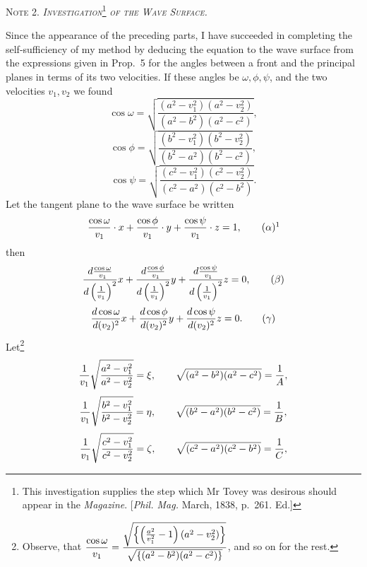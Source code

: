 \documentclass[11pt]{article}
\begin{document}
\begin{center}{\scshape Note 2. \quad \emph{Investigation}\footnote{This investigation supplies the step which Mr Tovey was desirous should appear in the \emph{Magazine}. [\emph{Phil. Mag.} March, 1838, p.~261. Ed.]} \emph{of the Wave Surface.}}\end{center}

Since the appearance of the preceding parts, I have succeeded in completing the self-sufficiency of my method by deducing the equation to the wave surface from the expressions given in Prop.~5 for the angles between a front and the principal planes in terms of its two velocities. If these angles be $\omega,\phi,\psi$, and the two velocities $v_1,v_2$ we found
\[
 \cos\omega=\sqrt{\frac{(a^2-v_1^2)(a^2-v_2^2)}{(a^2-b^2)(a^2-c^2)}},
\]
\[
 \cos\phi=\sqrt{\frac{(b^2-v_1^2)(b^2-v_2^2)}{(b^2-a^2)(b^2-c^2)}},
\]
\[
 \cos\psi=\sqrt{\frac{(c^2-v_1^2)(c^2-v_2^2)}{(c^2-a^2)(c^2-b^2)}}.
\]
Let the tangent plane to the wave surface be written
\[
 {\cos\omega\over v_1}\cdot x+{\cos\phi\over v_1}\cdot y+{\cos\psi\over v_1}\cdot z=1,\tag{$\alpha$}\footnotemark
\]
then
\[
 \frac{d{\cos\omega\over v_1}}{d\left({1\over v_1}\right)^2}x
 +\frac{d{\cos\phi\over v_1}}{d\left({1\over v_1}\right)^2}y
 +\frac{d{\cos\psi\over v_1}}{d\left({1\over v_1}\right)^2}z=0,\tag{$\beta$}
\]
\[
 {d\cos\omega\over d(v_2)^2}x+{d\cos\phi\over d(v_2)^2}y+{d\cos\psi\over d(v_2)^2}z=0.\tag{$\gamma$}
\]
Let\footnote{Observe, that $\dfrac{\cos\omega}{v_1}=\dfrac{\sqrt{\left\{\left({a^2\over v_1^2}-1\right)(a^2-v_2^2)\right\}}}{\sqrt{\{(a^2-b^2)(a^2-c^2)\}}}$, and so on for the rest.}
\[
 {1\over v_1}\sqrt{\frac{a^2-v_1^2}{a^2-v_2^2}}=\xi,
 \qquad
 \sqrt{(a^2-b^2)(a^2-c^2)}={1\over A},
\]
\[
 {1\over v_1}\sqrt{\frac{b^2-v_1^2}{b^2-v_2^2}}=\eta,
 \qquad
 \sqrt{(b^2-a^2)(b^2-c^2)}={1\over B},
\]
\[
 {1\over v_1}\sqrt{\frac{c^2-v_1^2}{c^2-v_2^2}}=\zeta,
 \qquad
 \sqrt{(c^2-a^2)(c^2-b^2)}={1\over C},
\]
\end{document}
